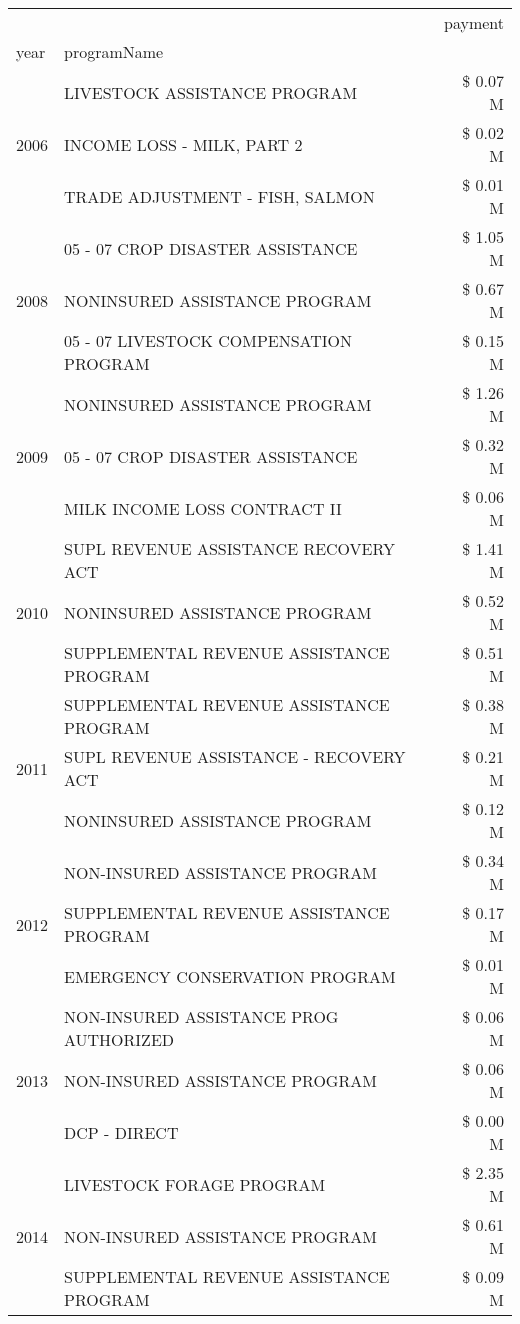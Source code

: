 \begin{tabular}{llr}
\toprule
 &  & payment \\
year & programName &  \\
\midrule
\multirow[t]{3}{*}{2006} & LIVESTOCK ASSISTANCE PROGRAM & \$ 0.07 M \\
 & INCOME LOSS - MILK, PART 2 & \$ 0.02 M \\
 & TRADE ADJUSTMENT - FISH, SALMON & \$ 0.01 M \\
\cline{1-3}
\multirow[t]{3}{*}{2008} & 05 - 07 CROP DISASTER ASSISTANCE & \$ 1.05 M \\
 & NONINSURED ASSISTANCE PROGRAM & \$ 0.67 M \\
 & 05 - 07 LIVESTOCK COMPENSATION PROGRAM & \$ 0.15 M \\
\cline{1-3}
\multirow[t]{3}{*}{2009} & NONINSURED ASSISTANCE PROGRAM & \$ 1.26 M \\
 & 05 - 07 CROP DISASTER ASSISTANCE & \$ 0.32 M \\
 & MILK INCOME LOSS CONTRACT II & \$ 0.06 M \\
\cline{1-3}
\multirow[t]{3}{*}{2010} & SUPL REVENUE ASSISTANCE RECOVERY ACT & \$ 1.41 M \\
 & NONINSURED ASSISTANCE PROGRAM & \$ 0.52 M \\
 & SUPPLEMENTAL REVENUE ASSISTANCE PROGRAM & \$ 0.51 M \\
\cline{1-3}
\multirow[t]{3}{*}{2011} & SUPPLEMENTAL REVENUE ASSISTANCE PROGRAM & \$ 0.38 M \\
 & SUPL REVENUE ASSISTANCE - RECOVERY ACT & \$ 0.21 M \\
 & NONINSURED ASSISTANCE PROGRAM & \$ 0.12 M \\
\cline{1-3}
\multirow[t]{3}{*}{2012} & NON-INSURED ASSISTANCE PROGRAM & \$ 0.34 M \\
 & SUPPLEMENTAL REVENUE ASSISTANCE PROGRAM & \$ 0.17 M \\
 & EMERGENCY CONSERVATION PROGRAM & \$ 0.01 M \\
\cline{1-3}
\multirow[t]{3}{*}{2013} & NON-INSURED ASSISTANCE PROG AUTHORIZED & \$ 0.06 M \\
 & NON-INSURED ASSISTANCE PROGRAM & \$ 0.06 M \\
 & DCP - DIRECT & \$ 0.00 M \\
\cline{1-3}
\multirow[t]{3}{*}{2014} & LIVESTOCK FORAGE PROGRAM & \$ 2.35 M \\
 & NON-INSURED ASSISTANCE PROGRAM & \$ 0.61 M \\
 & SUPPLEMENTAL REVENUE ASSISTANCE PROGRAM & \$ 0.09 M \\

\end{tabular}
